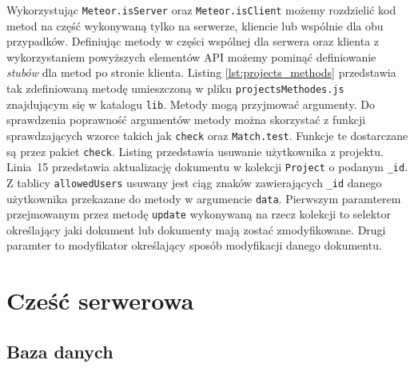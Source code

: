 Wykorzystując \verb|Meteor.isServer| oraz \verb|Meteor.isClient| możemy rozdzielić kod metod na część wykonywaną tylko na serwerze, kliencie lub wspólnie dla obu przypadków. Definiując metody w części wspólnej dla serwera oraz klienta z wykorzystaniem powyższych elementów API możemy pominąć definiowanie \textit{stubów} dla metod po stronie klienta. Listing \ref{lst:projects_methods} przedstawia  tak zdefiniowaną metodę umieszczoną w  pliku \verb|projectsMethodes.js| znajdującym się w katalogu \verb|lib|. Metody mogą przyjmować argumenty. Do sprawdzenia poprawność argumentów metody można skorzystać z funkcji sprawdzających wzorce takich jak \verb|check| oraz \verb|Match.test|. Funkcje te dostarczane są przez pakiet \verb|check|. Listing przedstawia usuwanie użytkownika z projektu. Linia~15 przedstawia aktualizację dokumentu w kolekcji \verb|Project| o podanym \verb|_id|. Z tablicy \verb|allowedUsers| usuwany jest ciąg znaków zawierających \verb|_id| danego użytkownika przekazane do metody w argumencie \verb|data|. Pierwszym paramterem przejmowanym przez metodę \verb|update| wykonywaną na rzecz kolekcji to selektor określający jaki dokument lub dokumenty mają zostać zmodyfikowane. Drugi paramter to modyfikator określający sposób modyfikacji danego dokumentu. 

\section{Cześć serwerowa}
  \subsection{Baza danych}
